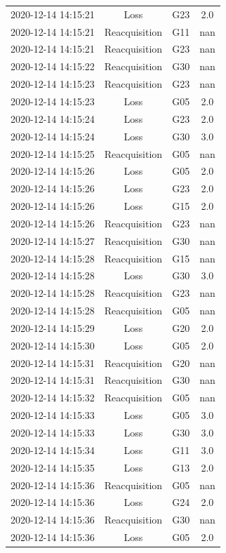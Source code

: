 \begin{enumerate}
\begin{longtabu}{cccc}
2020{-}12{-}14 14:15:21&Loss&G23&2.0\\%
2020{-}12{-}14 14:15:21&Reacquisition&G11&nan\\%
2020{-}12{-}14 14:15:21&Reacquisition&G23&nan\\%
2020{-}12{-}14 14:15:22&Reacquisition&G30&nan\\%
2020{-}12{-}14 14:15:23&Reacquisition&G23&nan\\%
2020{-}12{-}14 14:15:23&Loss&G05&2.0\\%
2020{-}12{-}14 14:15:24&Loss&G23&2.0\\%
2020{-}12{-}14 14:15:24&Loss&G30&3.0\\%
2020{-}12{-}14 14:15:25&Reacquisition&G05&nan\\%
2020{-}12{-}14 14:15:26&Loss&G05&2.0\\%
2020{-}12{-}14 14:15:26&Loss&G23&2.0\\%
2020{-}12{-}14 14:15:26&Loss&G15&2.0\\%
2020{-}12{-}14 14:15:26&Reacquisition&G23&nan\\%
2020{-}12{-}14 14:15:27&Reacquisition&G30&nan\\%
2020{-}12{-}14 14:15:28&Reacquisition&G15&nan\\%
2020{-}12{-}14 14:15:28&Loss&G30&3.0\\%
2020{-}12{-}14 14:15:28&Reacquisition&G23&nan\\%
2020{-}12{-}14 14:15:28&Reacquisition&G05&nan\\%
2020{-}12{-}14 14:15:29&Loss&G20&2.0\\%
2020{-}12{-}14 14:15:30&Loss&G05&2.0\\%
2020{-}12{-}14 14:15:31&Reacquisition&G20&nan\\%
2020{-}12{-}14 14:15:31&Reacquisition&G30&nan\\%
2020{-}12{-}14 14:15:32&Reacquisition&G05&nan\\%
2020{-}12{-}14 14:15:33&Loss&G05&3.0\\%
2020{-}12{-}14 14:15:33&Loss&G30&3.0\\%
2020{-}12{-}14 14:15:34&Loss&G11&3.0\\%
2020{-}12{-}14 14:15:35&Loss&G13&2.0\\%
2020{-}12{-}14 14:15:36&Reacquisition&G05&nan\\%
2020{-}12{-}14 14:15:36&Loss&G24&2.0\\%
2020{-}12{-}14 14:15:36&Reacquisition&G30&nan\\%
2020{-}12{-}14 14:15:36&Loss&G05&2.0\\%

\end{longtabu}
\end{enumerate}
